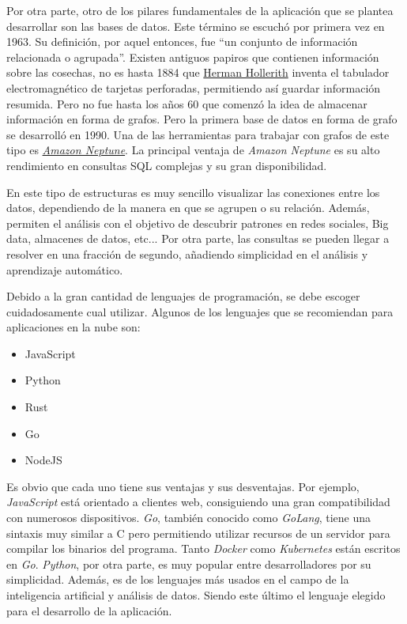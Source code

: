 Por otra parte, otro de los pilares fundamentales de la aplicación que se plantea desarrollar son las bases de datos. Este término se escuchó por primera vez en 1963. Su definición, por aquel entonces, fue ``un conjunto de información relacionada o agrupada''\cite{definition-database}. Existen antiguos papiros que contienen información sobre las cosechas, no es hasta 1884 que \href{https://es.wikipedia.org/wiki/Herman_Hollerith}{Herman Hollerith} inventa el tabulador electromagnético de tarjetas perforadas, permitiendo así guardar información resumida. Pero no fue hasta los años 60 que comenzó la idea de almacenar información en forma de grafos. Pero la primera base de datos en forma de grafo se desarrolló en 1990. Una de las herramientas para trabajar con grafos de este tipo es \href{https://aws.amazon.com/es/neptune/features/}{\emph{Amazon Neptune}}. La principal ventaja de \emph{Amazon Neptune} es su alto rendimiento en consultas SQL complejas y su gran disponibilidad.  

En este tipo de estructuras es muy sencillo visualizar las conexiones entre los datos, dependiendo de la manera en que se agrupen o su relación. Además, permiten el análisis con el objetivo de descubrir patrones en redes sociales, Big data, almacenes de datos, etc... Por otra parte, las consultas se pueden llegar a resolver en una fracción de segundo, añadiendo simplicidad en el análisis y aprendizaje automático. 

Debido a la gran cantidad de lenguajes de programación, se debe escoger cuidadosamente cual utilizar. Algunos de los lenguajes que se recomiendan \cite{known-lan} para aplicaciones en la nube son: 
\begin{itemize}
    \item JavaScript
    \item Python
    \item Rust
    \item Go
    \item NodeJS
\end{itemize}
Es obvio que cada uno tiene sus ventajas y sus desventajas. Por ejemplo, \emph{JavaScript} está orientado a clientes web, consiguiendo una gran compatibilidad con numerosos dispositivos. \emph{Go}, también conocido como \emph{GoLang}, tiene una sintaxis muy similar a C pero permitiendo utilizar recursos de un servidor para compilar los binarios del programa. Tanto \emph{Docker} como \emph{Kubernetes} están escritos en \emph{Go}. \emph{Python}, por otra parte, es muy popular entre desarrolladores por su simplicidad. Además, es de los lenguajes más usados en el campo de la inteligencia artificial y análisis de datos. Siendo este último el lenguaje elegido para el desarrollo de la aplicación. 





